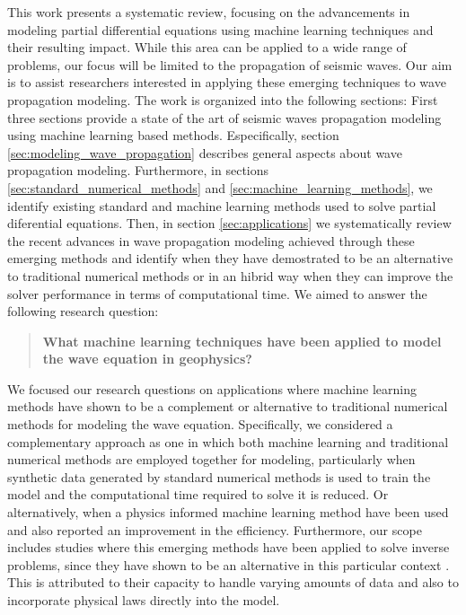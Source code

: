 \documentclass[11pt,twoside]{article}
\begin{document}
This work presents a systematic review, focusing on the advancements in modeling 
partial differential equations using machine learning techniques and their resulting impact. While this area 
can be applied to a wide range of problems, our focus will be limited to the propagation of seismic waves. 
Our aim is to assist researchers interested in applying these emerging techniques to wave propagation modeling.
The work is organized into the following sections: First three sections provide a state of the art of seismic 
waves propagation modeling using machine learning based methods. Especifically, section 
\ref{sec:modeling_wave_propagation} describes general aspects about wave propagation modeling. 
Furthermore, in sections \ref{sec:standard_numerical_methods} and \ref{sec:machine_learning_methods}, 
we identify existing standard and machine learning methods used to solve partial diferential equations. 
Then, in section \ref{sec:applications} we systematically review the recent advances in wave propagation 
modeling achieved through these emerging methods and identify when they have demostrated to be an alternative 
to traditional numerical methods or in an hibrid way when they can improve the solver performance in terms 
of computational time. We aimed to answer the following research question:

\vspace*{2mm}

\begin{tcolorbox}[colback=gray!20, colframe=gray!20, sharp corners]
\begin{quote}
\noindent\textbf{What machine learning techniques have been applied to model the wave equation in geophysics?}
\end{quote}
\end{tcolorbox}

\vspace*{2mm}

We focused our research questions on applications where machine learning methods have shown to be a complement or 
alternative to traditional numerical methods for modeling the wave equation. Specifically, we considered a complementary 
approach as one in which both machine learning and traditional numerical methods are employed together for modeling, 
particularly when synthetic data generated by standard numerical methods is used to train the model and the computational 
time required to solve it is reduced. Or alternatively, when a physics informed machine learning method have been used and 
also reported an improvement in the efficiency. Furthermore, our scope includes studies where this emerging methods have 
been applied to solve inverse problems, since they have shown to be an alternative in this particular context 
\citep{haghighat_physics-informed_2021,raissi_hidden_2020, hao_physics-informed_2023}. This is attributed to their 
capacity to handle varying amounts of data and also to incorporate physical laws directly into the model.
\end{document}
